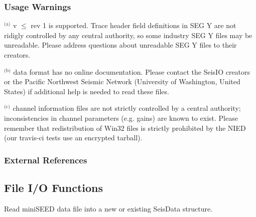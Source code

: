 \documentclass[letterpaper,11pt,english]{sphinxmanual}
\begin{document}
\subsubsection{Usage Warnings}
\label{\detokenize{src/Formats/fileformats:usage-warnings}}
$^{\text{(a)}}$   v \(\le\) rev 1 is supported. Trace header field
definitions in SEG Y are not ridigly controlled by any central authority, so
some industry SEG Y files may be unreadable. Please address questions about
unreadable SEG Y files to their creators.

$^{\text{(b)}}$   data format has no online documentation. Please contact the SeisIO creators or the Pacific Northwest Seismic Network (University of Washington, United States) if additional help is needed to read these files.

$^{\text{(c)}}$   channel information files are not strictly controlled by a central authority; inconsistencies in channel parameters (e.g. gains) are known to exist. Please remember that redistribution of Win32 files is strictly prohibited by the NIED (our travis-ci tests use an encrypted tarball).
\subsubsection*{External References}


\subsection{File I/O Functions}
\label{\detokenize{src/Formats/fileformats:file-i-o-functions}}

\begin{fulllineitems}
\label{\detokenize{src/Formats/fileformats:readmseed}}
\end{fulllineitems}



\begin{fulllineitems}
\end{fulllineitems}


Read miniSEED data file  into a new or existing SeisData structure.
\end{document}
